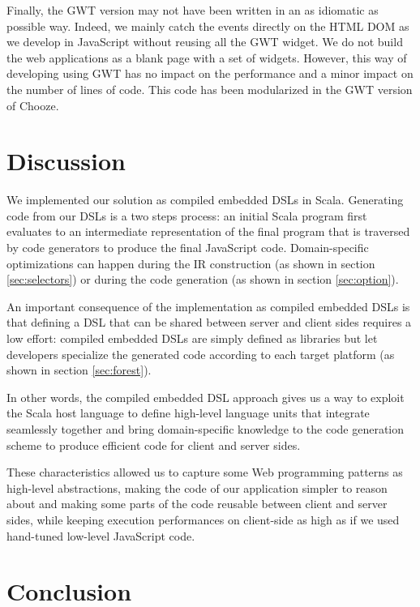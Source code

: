 \documentclass[preprint]{sigplanconf}
\begin{document}
Finally, the GWT version may not have been written in an as idiomatic as possible way. 
Indeed, we mainly catch the events directly on the HTML DOM as we develop in JavaScript without reusing all the GWT widget. We do not build the web applications as a blank page with a set of widgets. However, this way of developing using GWT has no impact on the performance and a minor impact on the number of lines of code. This code has been modularized in the GWT version of Chooze. 

\section{Discussion}
\label{sec:discussion}

We implemented our solution as compiled embedded DSLs in Scala. Generating code from our DSLs is a
two steps process: an initial Scala program first evaluates to an intermediate representation of
the final program that is traversed by code generators to produce the final JavaScript code.
Domain-specific optimizations can happen during the IR construction (as shown in section
\ref{sec:selectors}) or during the code generation (as shown in section \ref{sec:option}).

An important consequence of the implementation as compiled embedded DSLs is that defining a DSL
that can be shared between server and client sides requires a low effort: compiled embedded DSLs are
simply defined as libraries but let developers specialize the generated code according to each
target platform (as shown in section \ref{sec:forest}).

In other words, the compiled embedded DSL approach gives us a way to exploit the Scala host language
to define high-level language units that integrate seamlessly together and bring domain-specific
knowledge to the code generation scheme to produce efficient code for client and server sides.

These characteristics allowed us to capture some Web programming patterns as high-level
abstractions, making the code of our application simpler to reason about and making some parts of
the code reusable between client and server sides, while keeping execution performances on
client-side as high as if we used hand-tuned low-level JavaScript code.

\section{Conclusion}
\label{sec:conclusion}
\end{document}
